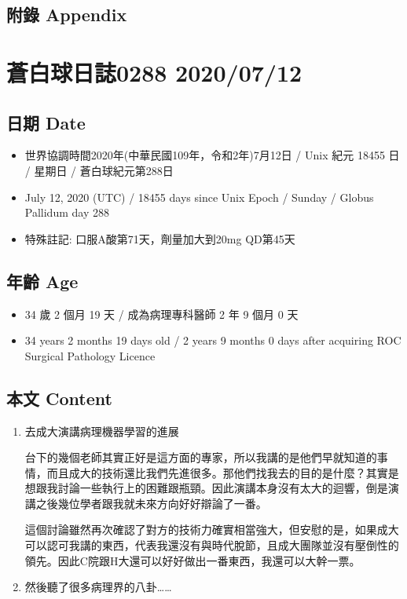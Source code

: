 \documentclass[a5paper, 11pt
]{book}
\providecommand{\tightlist}{%
  \setlength{\itemsep}{0pt}\setlength{\parskip}{0pt}}
\begin{document}
\hypertarget{ux9644ux9304-appendix-35}{%
\subsection{附錄 Appendix}\label{ux9644ux9304-appendix-35}}

\hypertarget{ux84bcux767dux7403ux65e5ux8a8c0288-20200712}{%
\section{蒼白球日誌0288
2020/07/12}\label{ux84bcux767dux7403ux65e5ux8a8c0288-20200712}}

\hypertarget{ux65e5ux671f-date-36}{%
\subsection{日期 Date}\label{ux65e5ux671f-date-36}}

\begin{itemize}
\tightlist
\item
  世界協調時間2020年(中華民國109年，令和2年)7月12日 / Unix 紀元 18455 日
  / 星期日 / 蒼白球紀元第288日
\item
  July 12, 2020 (UTC) / 18455 days since Unix Epoch / Sunday / Globus
  Pallidum day 288
\item
  特殊註記: 口服A酸第71天，劑量加大到20mg QD第45天
\end{itemize}

\hypertarget{ux5e74ux9f61-age-36}{%
\subsection{年齡 Age}\label{ux5e74ux9f61-age-36}}

\begin{itemize}
\tightlist
\item
  34 歲 2 個月 19 天 / 成為病理專科醫師 2 年 9 個月 0 天
\item
  34 years 2 months 19 days old / 2 years 9 months 0 days after
  acquiring ROC Surgical Pathology Licence
\end{itemize}

\hypertarget{ux672cux6587-content-36}{%
\subsection{本文 Content}\label{ux672cux6587-content-36}}

\begin{enumerate}
\def\labelenumi{\arabic{enumi}.}
\item
  去成大演講病理機器學習的進展

  台下的幾個老師其實正好是這方面的專家，所以我講的是他們早就知道的事情，而且成大的技術還比我們先進很多。那他們找我去的目的是什麼？其實是想跟我討論一些執行上的困難跟瓶頸。因此演講本身沒有太大的迴響，倒是演講之後幾位學者跟我就未來方向好好辯論了一番。

  這個討論雖然再次確認了對方的技術力確實相當強大，但安慰的是，如果成大可以認可我講的東西，代表我還沒有與時代脫節，且成大團隊並沒有壓倒性的領先。因此C院跟H大還可以好好做出一番東西，我還可以大幹一票。
\item
  然後聽了很多病理界的八卦\ldots\ldots{}
\end{enumerate}
\end{document}
